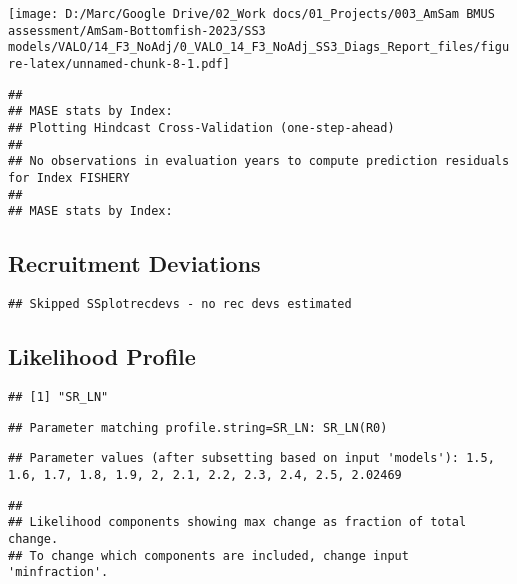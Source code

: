 \documentclass[
]{article}
\begin{document}
\texttt{[image: D:/Marc/Google Drive/02\_Work docs/01\_Projects/003\_AmSam BMUS assessment/AmSam-Bottomfish-2023/SS3 models/VALO/14\_F3\_NoAdj/0\_VALO\_14\_F3\_NoAdj\_SS3\_Diags\_Report\_files/figure-latex/unnamed-chunk-8-1.pdf]}

\begin{verbatim}
## 
## MASE stats by Index:
## Plotting Hindcast Cross-Validation (one-step-ahead) 
## 
## No observations in evaluation years to compute prediction residuals for Index FISHERY 
## 
## MASE stats by Index:
\end{verbatim}

\hypertarget{recruitment-deviations}{%
\subsection{Recruitment Deviations}\label{recruitment-deviations}}

\begin{verbatim}
## Skipped SSplotrecdevs - no rec devs estimated
\end{verbatim}

\hypertarget{likelihood-profile}{%
\subsection{Likelihood Profile}\label{likelihood-profile}}

\begin{verbatim}
## [1] "SR_LN"
\end{verbatim}

\begin{verbatim}
## Parameter matching profile.string=SR_LN: SR_LN(R0)
\end{verbatim}

\begin{verbatim}
## Parameter values (after subsetting based on input 'models'): 1.5, 1.6, 1.7, 1.8, 1.9, 2, 2.1, 2.2, 2.3, 2.4, 2.5, 2.02469
\end{verbatim}

\begin{verbatim}
## 
## Likelihood components showing max change as fraction of total change.
## To change which components are included, change input 'minfraction'.
\end{verbatim}
\end{document}

